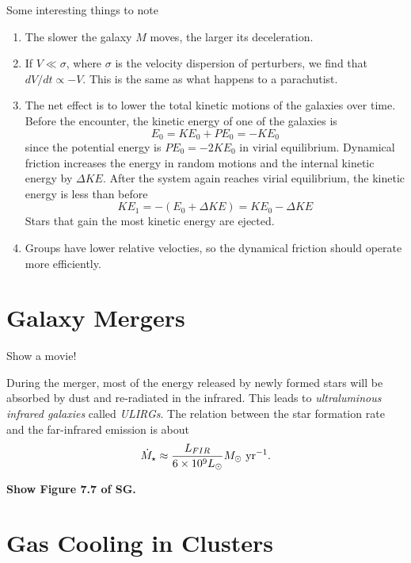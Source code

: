 \documentclass[]{article}
\begin{document}
Some interesting things to note
\begin{enumerate}
\item The slower the galaxy $M$ moves, the larger its deceleration.
\item If $V\ll\sigma$, where $\sigma$ is the velocity dispersion of perturbers, we find that $dV/dt\propto -V$.  This is the same as what happens to a parachutist.
\item The net effect is to lower the total kinetic motions of the galaxies over time.
Before the encounter, the kinetic energy of one of the galaxies is
\begin{equation}
E_0 = KE_0 + PE_0 = - KE_0
\end{equation}
\noindent
since the potential energy is $ PE_0 = - 2KE_0$ in virial equilibrium.
Dynamical friction increases the energy in random motions and the internal kinetic
energy by $\Delta KE$.  After the system again reaches virial equilibrium,
the kinetic energy is less than before
\begin{equation}
KE_1  = - (E_0 + \Delta KE) = KE_0 - \Delta KE
\end{equation}
\noindent
Stars that gain the most kinetic energy are ejected.
\item Groups have lower relative velocties, so the dynamical
friction should operate more efficiently.
\end{enumerate}

\section{Galaxy Mergers}

Show a movie!

During the merger, most of the energy released by newly formed
stars will be absorbed by dust and re-radiated in the infrared.
This leads to {\it ultraluminous infrared galaxies} called
{\it ULIRGs}.  The relation between the star formation rate and
the far-infrared emission is about
\begin{equation}
\dot{M}_{\star} \approx \frac{L_{FIR}}{6\times10^9L_{\odot}} M_{\odot}~\mathrm{yr}^{-1}.
\end{equation}

{\bf Show Figure 7.7 of SG.}

\section{Gas Cooling in Clusters}
\end{document}
